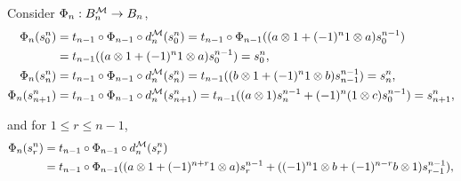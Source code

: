 \documentclass[10pt, reqno]{amsart}
\theoremstyle{definition}
\theoremstyle{remark}
\numberwithin{equation}{section}
\begin{document}
Consider $\Phi_n:B_n^{\mathcal{M}}\rightarrow{}B_n$, 
\[\begin{aligned}
    \Phi_n(s_0^n) &= t_{n-1}\circ\Phi_{n-1}\circ d_n^{\mathcal{M}}(s_0^n) = t_{n-1}\circ\Phi_{n-1}((a\otimes1+(-1)^n1\otimes a) s_0^{n-1})\\
                  &=t_{n-1}((a\otimes1+(-1)^n1\otimes a)s_0^{n-1}) = s_0^n,\\
    \Phi_n(s_n^n) &= t_{n-1}\circ\Phi_{n-1}\circ d_n^{\mathcal{M}}(s_n^n)  = t_{n-1}((b\otimes1+(-1)^n1\otimes b)s_{n-1}^{n-1})= s_n^n,\\
    \Phi_n(s_{n+1}^n) &= t_{n-1}\circ \Phi_{n-1}\circ d_n^{\mathcal{M}}(s_{n+1}^n) = t_{n-1}((a\otimes1)s_n^{n-1} +(-1)^n(1\otimes c)s_0^{n-1})= s_{n+1}^n,
\end{aligned}\]

and for $1\le r\le n-1$,
\[\begin{aligned}
    \Phi_n(s_r^n) &= t_{n-1}\circ\Phi_{n-1}\circ d_n^{\mathcal{M}}(s_r^n) \\
    &= t_{n-1}\circ\Phi_{n-1}((a \otimes 1 + (-1)^{n+r}1\otimes a) s_r^{n-1}+((-1)^n 1\otimes b+(-1)^{n-r}b \otimes 1)s_{r-1}^{n-1}),\\
\end{aligned}\]
\end{document}
